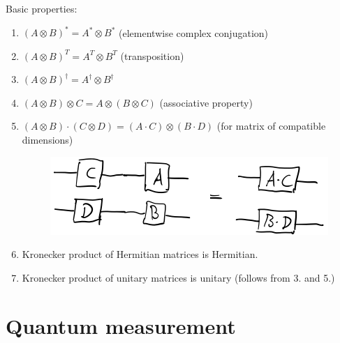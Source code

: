Basic properties:
\begin{enumerate}
    \item $(A \otimes B)^* = A^* \otimes B^*$ (elementwise complex conjugation)
    \item $(A \otimes B)^T = A^T \otimes B^T$ (transposition)
    \item $(A \otimes B)^\dag = A^\dag \otimes B^\dag$
    \item $(A \otimes B) \otimes C = A \otimes (B \otimes C)$ (associative property)
    \item $(A \otimes B) \cdot (C \otimes D) 
        = (A \cdot C) \otimes (B \cdot D)$ (for matrix of compatible dimensions)
        \begin{figure}[H]
            \centering
            \includegraphics[scale=0.48]{chapters/res/kronecker-properties.png}
        \end{figure}
    \item Kronecker product of Hermitian matrices is Hermitian.
    \item Kronecker product of unitary matrices is unitary (follows from 3. and 5.)
\end{enumerate}

\section{Quantum measurement}